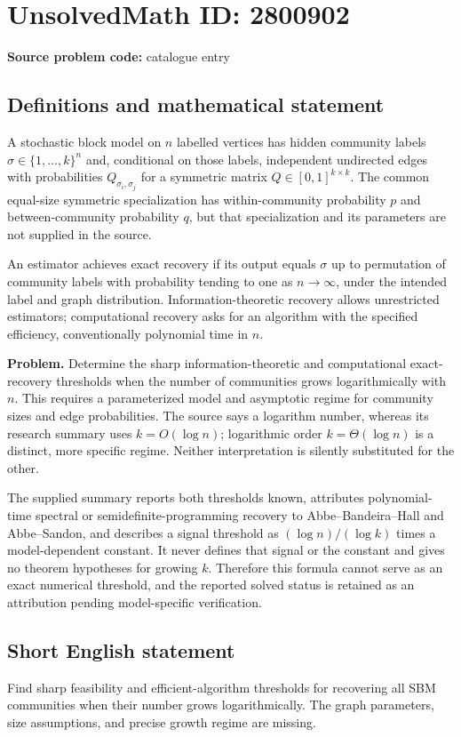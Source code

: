\documentclass[11pt]{article}
\begin{document}
\section*{UnsolvedMath ID: 2800902}
\textbf{Source problem code:} catalogue entry
\subsection{Definitions and mathematical statement}
A stochastic block model on $n$ labelled vertices has hidden community labels $\sigma\in\{1,\ldots,k\}^n$ and, conditional on those labels, independent undirected edges with probabilities $Q_{\sigma_i,\sigma_j}$ for a symmetric matrix $Q\in[0,1]^{k\times k}$. The common equal-size symmetric specialization has within-community probability $p$ and between-community probability $q$, but that specialization and its parameters are not supplied in the source.

An estimator achieves exact recovery if its output equals $\sigma$ up to permutation of community labels with probability tending to one as $n\to\infty$, under the intended label and graph distribution. Information-theoretic recovery allows unrestricted estimators; computational recovery asks for an algorithm with the specified efficiency, conventionally polynomial time in $n$.

\textbf{Problem.} Determine the sharp information-theoretic and computational exact-recovery thresholds when the number of communities grows logarithmically with $n$. This requires a parameterized model and asymptotic regime for community sizes and edge probabilities. The source says a logarithm number, whereas its research summary uses $k=O(\log n)$; logarithmic order $k=\Theta(\log n)$ is a distinct, more specific regime. Neither interpretation is silently substituted for the other.

The supplied summary reports both thresholds known, attributes polynomial-time spectral or semidefinite-programming recovery to Abbe--Bandeira--Hall and Abbe--Sandon, and describes a signal threshold as $(\log n)/(\log k)$ times a model-dependent constant. It never defines that signal or the constant and gives no theorem hypotheses for growing $k$. Therefore this formula cannot serve as an exact numerical threshold, and the reported solved status is retained as an attribution pending model-specific verification.
\subsection{Short English statement}
Find sharp feasibility and efficient-algorithm thresholds for recovering all SBM communities when their number grows logarithmically. The graph parameters, size assumptions, and precise growth regime are missing.
\end{document}
